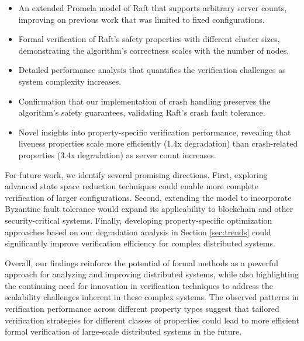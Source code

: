     \begin{itemize}
        \item An extended Promela model of Raft that supports arbitrary server counts, improving on previous work \cite{Qx1} that was limited to fixed configurations.
        
        \item Formal verification of Raft's safety properties with different cluster sizes, demonstrating the algorithm's correctness scales with the number of nodes.
        
        \item Detailed performance analysis that quantifies the verification challenges as system complexity increases.
        
        \item Confirmation that our implementation of crash handling preserves the algorithm's safety guarantees, validating Raft's crash fault tolerance.
        
        \item Novel insights into property-specific verification performance, revealing that liveness properties scale more efficiently (1.4x degradation) than crash-related properties (3.4x degradation) as server count increases.
    \end{itemize}
    
    For future work, we identify several promising directions. First, exploring advanced state space reduction techniques could enable more complete verification of larger configurations. Second, extending the model to incorporate Byzantine fault tolerance \cite{Qx6, Qx8, Castro} would expand its applicability to blockchain and other security-critical systems. Finally, developing property-specific optimization approaches based on our degradation analysis in Section \ref{sec:trends} could significantly improve verification efficiency for complex distributed systems.
    
    Overall, our findings reinforce the potential of formal methods as a powerful approach for analyzing and improving distributed systems, while also highlighting the continuing need for innovation in verification techniques to address the scalability challenges inherent in these complex systems. The observed patterns in verification performance across different property types suggest that tailored verification strategies for different classes of properties could lead to more efficient formal verification of large-scale distributed systems in the future.
    


    